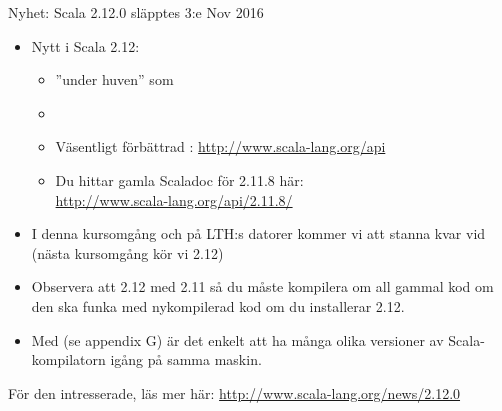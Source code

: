 


%
%


\begin{Slide}{Nyhet: Scala 2.12.0 släpptes 3:e Nov 2016}
\begin{itemize}
\item Nytt i Scala 2.12:
\begin{itemize}\SlideFontSmall
\item {} ''under huven'' som 
\item {} 
\item Väsentligt förbättrad : \url{http://www.scala-lang.org/api}
\item Du hittar gamla Scaladoc för 2.11.8 här: \\ \url{http://www.scala-lang.org/api/2.11.8/}

\end{itemize}
\item I denna kursomgång och på LTH:s datorer kommer vi att stanna kvar vid  (nästa kursomgång kör vi 2.12) 
\item Observera att 2.12  med 2.11 så du måste kompilera om all gammal kod om den ska funka med nykompilerad kod om du installerar 2.12.
\item Med  (se appendix G) är det enkelt att ha många olika versioner av Scala-kompilatorn igång på samma maskin.
\end{itemize}
{\SlideFontTiny För den intresserade, läs mer här: \url{http://www.scala-lang.org/news/2.12.0}}
\end{Slide}


